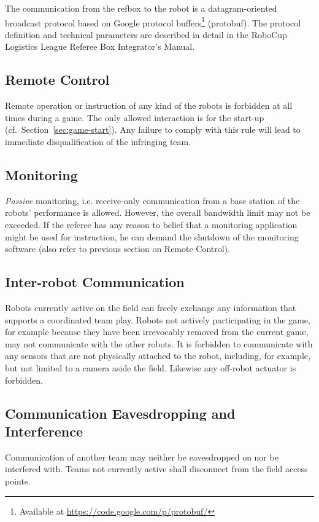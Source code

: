 \documentclass[12pt,twoside]{article}
\newcommand{\refsec}[1]{Section~\ref{#1}}
\begin{document}
The communication from the refbox to the robot is a datagram-oriented
broadcast protocol based on Google protocol buffers\footnote{Available
  at \url{https://code.google.com/p/protobuf/}} (protobuf). The
protocol definition and technical parameters are described in detail
in the RoboCup Logistics League Referee Box Integrator's Manual.

\subsection{Remote Control}
\label{sec:remote-control}
Remote operation or instruction of any kind of the robots is forbidden
at all times during a game. The only allowed interaction is for the
start-up (cf.~\refsec{sec:game-start}). Any failure to comply with
this rule will lead to immediate disqualification of the infringing
team.

\subsection{Monitoring}
\label{sec:monitoring}
\emph{Passive} monitoring, i.e. receive-only communication from a base
station of the robots' performance is allowed. However, the overall
bandwidth limit may not be exceeded.
If the referee has any reason to belief that a monitoring application
might be used for instruction, he can demand the shutdown of the
monitoring software (also refer to previous section on Remote
Control).

\subsection{Inter-robot Communication}
\label{sec:inter-robot-comm}
Robots currently active on the field can freely exchange any
information that supports a coordinated team play. Robots not actively
participating in the game, for example because they have been
irrevocably removed from the current game, may not communicate with
the other robots. It is forbidden to communicate with any sensors that
are not physically attached to the robot, including, for example, but
not limited to a camera aside the field. Likewise any off-robot
actuator is forbidden.

\subsection{Communication Eavesdropping and Interference}
\label{sec:comm-tampering}
Communication of another team may neither be eavesdropped on nor be
interfered with. Teams not currently active shall disconnect from the
field access points.
\end{document}
